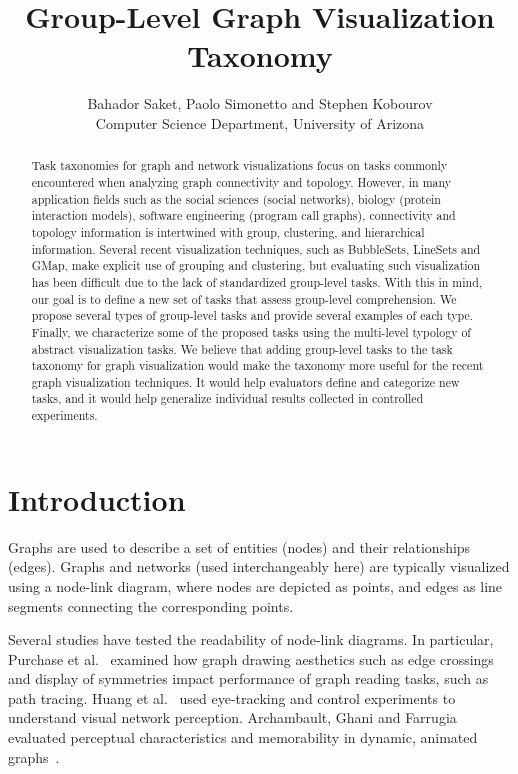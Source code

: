\documentclass{article}
\title{Group-Level Graph Visualization Taxonomy}
\author{Bahador Saket, Paolo Simonetto and Stephen Kobourov\\Computer Science Department, University of Arizona}
\date{}
\begin{document}
\maketitle


\begin{abstract}
Task taxonomies for graph and network visualizations focus on tasks commonly encountered when analyzing graph connectivity and topology. However, in many application fields such as the social sciences (social networks), biology (protein interaction models), software engineering (program call graphs), connectivity and topology information is intertwined with group, clustering, and hierarchical information. Several recent visualization techniques, such as BubbleSets, LineSets and GMap, make explicit use of grouping and clustering, but evaluating such visualization has been difficult due to the lack of standardized group-level tasks. With this in mind, our goal is to define a new set of tasks that assess group-level comprehension. We propose several types of group-level tasks and provide several examples of each type. Finally, we characterize some of the proposed tasks using the multi-level typology of abstract visualization tasks. We believe that adding group-level tasks to the task taxonomy for graph visualization would make the taxonomy more useful for the recent graph visualization techniques. It would help evaluators define and categorize new tasks, and it would help generalize individual results collected in controlled experiments.

\end{abstract}


\section{Introduction} \label{SEC:Introduction}
Graphs are used to describe a set of entities (nodes) and their relationships (edges). Graphs and networks (used interchangeably here) are typically visualized using a node-link diagram, where nodes are depicted as points, and edges as line segments connecting the corresponding points.


Several studies have tested the readability of node-link diagrams. In particular, Purchase et al.~\cite{Graph_layout_evaluation_Purchase,Graph_layout_evaluation_UML} examined how graph drawing aesthetics such as edge crossings and display of symmetries impact performance of graph reading tasks, such as path tracing. Huang et al.~\cite{IV_Huang1, IV_Huang2, IV_Huang3, IV_Huang4} used eye-tracking and control experiments to understand visual network perception. Archambault, Ghani and Farrugia evaluated perceptual characteristics and memorability in dynamic, animated graphs~\cite{IV_ghani2, IV_Farrugia, IV_Arcambault1, IV_Arcambault2}.
\end{document}
